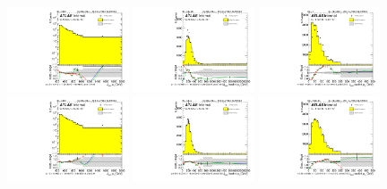 \begin{figure}[htbp!]
\begin{center}
\includegraphics[width=0.32\textwidth,angle=-90]{figures/boosted/Reweight/Fits/Moriond_NoTag_4Trk_subl_Incl_leadHCand_Pt_m_1.pdf}
\includegraphics[width=0.32\textwidth,angle=-90]{figures/boosted/Reweight/Fits/Moriond_NoTag_4Trk_subl_Incl_leadHCand_trk0_Pt.pdf}
\includegraphics[width=0.32\textwidth,angle=-90]{figures/boosted/Reweight/Fits/Moriond_NoTag_4Trk_subl_Incl_leadHCand_trk1_Pt.pdf} \\
\includegraphics[width=0.32\textwidth,angle=-90]{figures/boosted/Reweight/Fits/Moriond_bkg_0_NoTag_4Trk_subl_Incl_leadHCand_Pt_m_1.pdf}
\includegraphics[width=0.32\textwidth,angle=-90]{figures/boosted/Reweight/Fits/Moriond_bkg_0_NoTag_4Trk_subl_Incl_leadHCand_trk0_Pt.pdf}
\includegraphics[width=0.32\textwidth,angle=-90]{figures/boosted/Reweight/Fits/Moriond_bkg_0_NoTag_4Trk_subl_Incl_leadHCand_trk1_Pt.pdf} \\

\end{center}
\end{figure}
